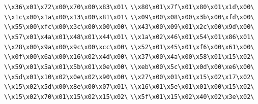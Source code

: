 \verb|\\x36\x01\x72\x00\x70\x00\x83\x01\|\newline
\verb|\\x80\x01\x7f\x01\x80\x01\x1d\x00\|\newline
\verb|\\x1c\x00\x1a\x00\x13\x00\x81\x01\|\newline
\verb|\\x09\x00\x08\x00\x3b\x00\xfd\x00\|\newline
\verb|\\x55\x00\xfc\x00\x3c\x00\x00\x00\|\newline
\verb|\\x43\x00\x09\x01\x2c\x00\x9d\x00\|\newline
\verb|\\x57\x01\x4a\x01\x48\x01\x44\x01\|\newline
\verb|\\x1a\x02\x46\x01\x54\x01\x86\x01\|\newline
\verb|\\x28\x00\x9a\x00\x9c\x00\xcc\x00\|\newline
\verb|\\x52\x01\x45\x01\xf6\x00\x61\x00\|\newline
\verb|\\x0f\x00\x6a\x00\x16\x02\x4d\x00\|\newline
\verb|\\x37\x00\x4a\x00\x58\x01\x15\x02\|\newline
\verb|\\x59\x01\x5a\x01\x5b\x01\x0e\x00\|\newline
\verb|\\xeb\x00\x5c\x01\x0d\x00\xe6\x00\|\newline
\verb|\\x5d\x01\x10\x02\x0e\x02\x90\x00\|\newline
\verb|\\x27\x00\x01\x01\x15\x02\x17\x02\|\newline
\verb|\\x15\x02\x5d\x00\x8e\x00\x07\x01\|\newline
\verb|\\x16\x01\x5e\x01\x01\x00\x15\x02\|\newline
\verb|\\x15\x02\x70\x01\x15\x02\x15\x02\|\newline
\verb|\\x5f\x01\x15\x02\x40\x02\x3e\x02\|\newline
